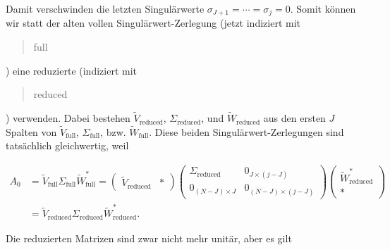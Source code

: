 Damit verschwinden die letzten Singulärwerte $\sigma_{J+1} = \cdots = \sigma_j = 0$.
Somit können wir statt der alten vollen Singulärwert-Zerlegung (jetzt indiziert mit \blockquote{full}) eine reduzierte (indiziert mit \blockquote{reduced}) verwenden.
Dabei bestehen $\tilde V_\mathrm{reduced}$, $\Sigma_\mathrm{reduced}$, und $\tilde W_\mathrm{reduced}$ aus den ersten $J$ Spalten von $\tilde V_\mathrm{full}$, $\Sigma_\mathrm{full}$, bzw. $\tilde W_\mathrm{full}$.
Diese beiden Singulärwert-Zerlegungen sind tatsächlich gleichwertig, weil

\begin{align*}
    A_0
    & =
    \tilde V_\mathrm{full} \Sigma_\mathrm{full} \tilde W_\mathrm{full}^\ast
    =
    \begin{pmatrix}
        \tilde V_\mathrm{reduced} & \ast
    \end{pmatrix}
    \begin{pmatrix}
        \Sigma_\mathrm{reduced} & 0_{J \times (j - J)} \\
        0_{(N - J) \times J}    & 0_{(N - J) \times (j - J)}
    \end{pmatrix}
    \begin{pmatrix}
        \tilde W_\mathrm{reduced}^\ast \\ \ast
    \end{pmatrix} \\
    & =
    \tilde V_\mathrm{reduced} \Sigma_\mathrm{reduced} \tilde W_\mathrm{reduced}^\ast.
\end{align*}

Die reduzierten Matrizen sind zwar nicht mehr unitär, aber es gilt

